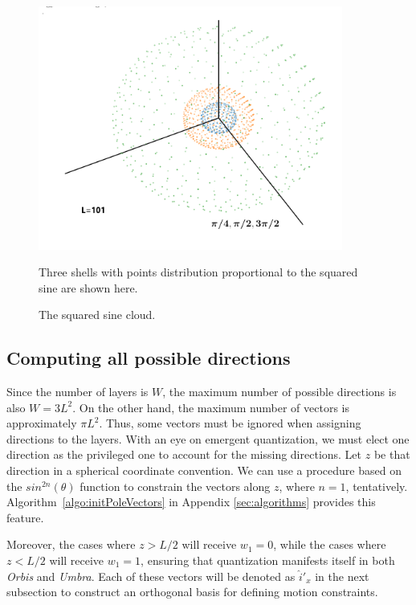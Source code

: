 \documentclass[12pt,english]{article}
\begin{document}
\begin{figure}
\centering
\includegraphics[width=10cm]{fig2}
\caption{The squared sine cloud.}
\footnotesize{Three shells with points distribution proportional to the squared sine are shown here.}
\label{fig2}
\end{figure}

\subsection{Computing all possible directions} \label{subsec:all-dirs}

Since the number of layers is $W$, the maximum number of possible directions is also $W = 3L^2$. On the other hand, the maximum  number of vectors is approximately $\pi L^2$. Thus, some vectors must be ignored when assigning directions to the layers. With an eye on emergent quantization, we must elect one direction as the privileged one to account for the missing directions. Let $z$ be that direction in a spherical coordinate convention. We can use a procedure based on the $sin^{2n}(\theta)$ function to constrain the vectors along $z$, where $n=1$, tentatively. Algorithm~\ref{algo:initPoleVectors} in Appendix \ref{sec:algorithms} provides this feature.

Moreover, the cases where $z > L/2$ will receive $w_1 = 0$, while the cases where $z < L/2$ will receive $w_1 = 1$, ensuring that quantization manifests itself in both \textit{Orbis} and \textit{Umbra}. Each of these vectors will be denoted as $\hat{i}'_x$ in the next subsection to construct an orthogonal basis for defining motion constraints.
\end{document}
